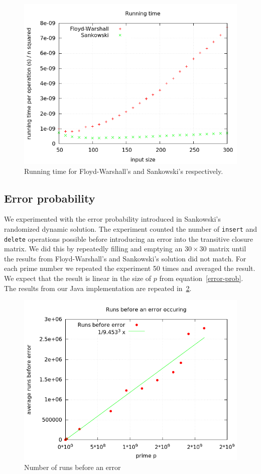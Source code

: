 \documentclass[a4paper,oneside,article,11pt]{memoir}
\begin{document}
\begin{figure}[ht]
\includegraphics[width=\textwidth]{images/running-time-GOOD.png}
\caption{Running time for Floyd-Warshall's and Sankowski's respectively.}
\label{fig:running}
\end{figure}

\subsection{Error probability}
We experimented with the error probability introduced in Sankowski's randomized dynamic solution. The experiment counted the number of \texttt{insert} and \texttt{delete} operations possible before introducing an error into the transitive closure matrix. We did this by repeatedly filling and emptying an $30 \times 30$ matrix until the results from Floyd-Warshall's and Sankowski's solution did not match. For each prime number we repeated the experiment 50 times and averaged the result. We expect that the result is linear in the size of $p$ from equation~\ref{error-prob}. The results from our Java implementation are repeated in~\ref{fig:num-runs}.
\begin{figure}[ht]
\includegraphics[width=\textwidth]{images/error-probability2.png}
\caption{Number of runs before an error}
\label{fig:num-runs}
\end{figure}


\end{document}
